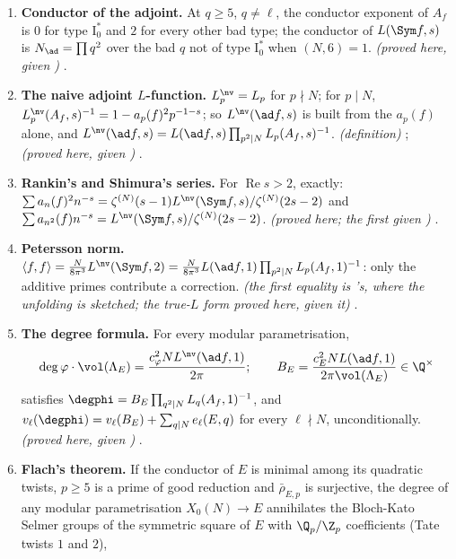 \begin{enumerate}[label=\textbf{\thechapter.\arabic*}]
entire, with gamma factor $\Gamma_\R(s+1)\Gamma_\C(s+1)$ and functional equation $s\leftrightarrow1-s$; $L(\ad f,1)>0$. \emph{(stated; positivity proved here, given
)} .
\item \textbf{Conductor of the adjoint.} At $q\ge5$, $q\ne\ell$, the conductor exponent of $A_f$ is $0$ for type $\mathrm I_0^*$ and $2$ for every other bad type;
the conductor of $L(\Sym f,s)$ is $N_{\ad}=\prod q^2$ over the bad $q$ not of type $\mathrm I_0^*$ when $(N,6)=1$. \emph{(proved here, given )}
.
\item \textbf{The naive adjoint $L$-function.} $L_p^{\nv}=L_p$ for $p\nmid N$; for $p\mid N$, $L_p^{\nv}(A_f,s)^{-1}=1-a_p(f)^2p^{-1-s}$; so $L^{\nv}(\ad f,s)$ is built from
the $a_p(f)$ alone, and $L^{\nv}(\ad f,s)=L(\ad f,s)\prod_{p^2\mid N}L_p(A_f,s)^{-1}$. \emph{(definition)} ; \emph{(proved here, given
)} .
\item \textbf{Rankin's and Shimura's series.} For $\operatorname{Re}s>2$, exactly: $\sum a_n(f)^2n^{-s}=\zeta^{(N)}(s-1)L^{\nv}(\Sym f,s)/\zeta^{(N)}(2s-2)$ and
$\sum a_{n^2}(f)n^{-s}=L^{\nv}(\Sym f,s)/\zeta^{(N)}(2s-2)$. \emph{(proved here; the first given )} .
\item \textbf{Petersson norm.} $\langle f,f\rangle=\frac N{8\pi^3}L^{\nv}(\Sym f,2)=\frac N{8\pi^3}L(\ad f,1)\prod_{p^2\mid N}L_p(A_f,1)^{-1}$: only the additive primes
contribute a correction. \emph{(the first equality is 's, where the unfolding is sketched; the true-$L$ form proved here, given it)} .
\item \textbf{The degree formula.} For every modular parametrisation,
\[
\deg\varphi\cdot\vol(\Lambda_E)=\frac{c_\varphi^2NL^{\nv}(\ad f,1)}{2\pi};\qquad B_E=\frac{c_E^2NL(\ad f,1)}{2\pi\vol(\Lambda_E)}\in\Q^\times
\]
satisfies $\degphi=B_E\prod_{q^2\mid N}L_q(A_f,1)^{-1}$, and $v_\ell(\degphi)=v_\ell(B_E)+\sum_{q\mid N}e_\ell(E,q)$ for every $\ell\nmid N$, unconditionally. \emph{(proved here, given
)} .
\item \textbf{Flach's theorem.} If the conductor of $E$ is minimal among its quadratic twists, $p\ge5$ is a prime of good reduction and $\bar\rho_{E,p}$ is surjective, the degree
of any modular parametrisation $X_0(N)\to E$ annihilates the Bloch-Kato Selmer groups of the symmetric square of $E$ with $\Q_p/\Z_p$ coefficients (Tate twists $1$ and $2$),

\end{enumerate}
